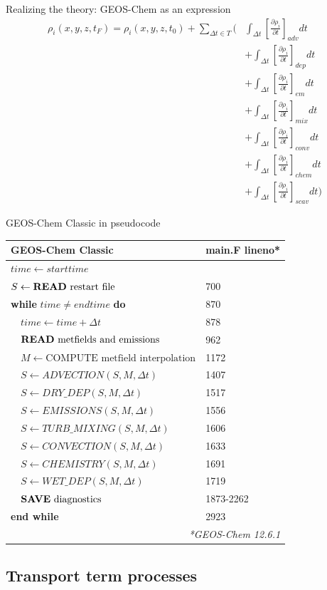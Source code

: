 \documentclass[10pt]{beamer}
\newcommand{\gccpseudocode}{%
    \small
    \setlength{\tabcolsep}{20pt}
    \begin{table}[]
    \begin{tabular}{ll}
    \hline
    \textbf{GEOS-Chem Classic} & \textbf{main.F lineno}* \\ \hline
    $time \leftarrow starttime$ &  \\
    $S \leftarrow \text{\textbf{READ} restart file}$ &  700 \\
    \textbf{while} $time \neq endtime$ \textbf{do} & 870 \\
    $\quad time \leftarrow time + \Delta t$ & 878 \\
    $\quad \text{\textbf{READ} metfields and emissions}$ & 962 \\
    $\quad M \leftarrow \text{COMPUTE metfield interpolation}$ & 1172 \\
    $\quad S \leftarrow ADVECTION(S, M, \Delta t)$ & 1407 \\
    $\quad S \leftarrow DRY\_DEP(S, M, \Delta t)$ & 1517 \\
    $\quad S \leftarrow EMISSIONS(S, M, \Delta t)$ & 1556 \\
    $\quad S \leftarrow TURB\_MIXING(S, M, \Delta t)$ & 1606 \\
    $\quad S \leftarrow CONVECTION(S, M, \Delta t)$ & 1633 \\
    $\quad S \leftarrow CHEMISTRY(S, M, \Delta t)$& 1691 \\
    $\quad S \leftarrow WET\_DEP(S, M, \Delta t)$ & 1719 \\
    $\quad \text{\textbf{SAVE} diagnostics}$ & 1873-2262 \\
    \textbf{end while} & 2923 \\ \hline
    \multicolumn{2}{r}{\fontsize{4}{4}\selectfont\textit{*GEOS-Chem 12.6.1}} \\
    \end{tabular}
    \end{table}
}
\begin{document}
\begin{frame}[fragile]{Realizing the theory: GEOS-Chem as an expression}
    \small
    \begin{align*}
        \rho_i(x, y, z, t_F) = \rho_i(x, y, z, t_0) + \sum_{\Delta t \in T} (
        & \int_{\Delta t}\left[ \frac{\partial \rho_i}{\partial t} \right]_{adv} dt \\& + 
        \int_{\Delta t}\left[ \frac{\partial \rho_i}{\partial t} \right]_{dep} dt \\ & + 
        \int_{\Delta t}\left[ \frac{\partial \rho_i}{\partial t} \right]_{em} dt \\& +
        \int_{\Delta t}\left[ \frac{\partial \rho_i}{\partial t} \right]_{mix} dt \\ & + 
        \int_{\Delta t}\left[ \frac{\partial \rho_i}{\partial t} \right]_{conv} dt \\& +
        \int_{\Delta t}\left[ \frac{\partial \rho_i}{\partial t} \right]_{chem} dt \\ & + 
        \int_{\Delta t}\left[ \frac{\partial \rho_i}{\partial t} \right]_{scav} dt )
    \end{align*}
\end{frame}

\begin{frame}[fragile]{GEOS-Chem Classic in pseudocode}
    \gccpseudocode
\end{frame}

\subsection{Transport term processes}
\frame{\sectionpage}
\end{document}
